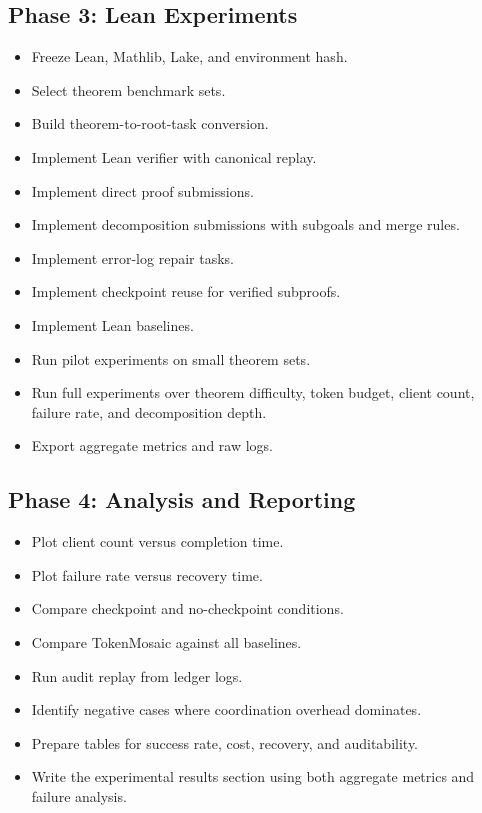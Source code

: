 \documentclass{article}
\theoremstyle{plain}
\begin{document}
\subsection{Phase 3: Lean Experiments}

\begin{itemize}[leftmargin=*]
  \item Freeze Lean, Mathlib, Lake, and environment hash.
  \item Select theorem benchmark sets.
  \item Build theorem-to-root-task conversion.
  \item Implement Lean verifier with canonical replay.
  \item Implement direct proof submissions.
  \item Implement decomposition submissions with subgoals and merge rules.
  \item Implement error-log repair tasks.
  \item Implement checkpoint reuse for verified subproofs.
  \item Implement Lean baselines.
  \item Run pilot experiments on small theorem sets.
  \item Run full experiments over theorem difficulty, token budget, client count, failure rate, and decomposition depth.
  \item Export aggregate metrics and raw logs.
\end{itemize}

\subsection{Phase 4: Analysis and Reporting}

\begin{itemize}[leftmargin=*]
  \item Plot client count versus completion time.
  \item Plot failure rate versus recovery time.
  \item Compare checkpoint and no-checkpoint conditions.
  \item Compare TokenMosaic against all baselines.
  \item Run audit replay from ledger logs.
  \item Identify negative cases where coordination overhead dominates.
  \item Prepare tables for success rate, cost, recovery, and auditability.
  \item Write the experimental results section using both aggregate metrics and failure analysis.
\end{itemize}
\end{document}
